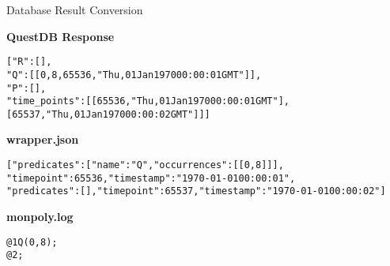 \begin{frame}{Database Result Conversion}

\textbf{QuestDB Response}
    \begin{alltt}
[{"R":[]},\\
{"Q":[[0,8,65536,"Thu, 01 Jan 1970 00:00:01 GMT"]]},\\
{"P":[]},\\
{"time\_points":[[65536,"Thu, 01 Jan 1970 00:00:01 GMT"],
                 [65537,"Thu, 01 Jan 1970 00:00:02 GMT"]]}]
    \end{alltt}
\textbf{wrapper.json}
    \begin{alltt}
    [{"predicates":[{"name":"Q","occurrences":[[0,8]]}], \\
        "timepoint":65536,"timestamp":"1970-01-01 00:00:01"}, \\
    {"predicates":[],"timepoint":65537,"timestamp":"1970-01-01 00:00:02"}]
    \end{alltt}

\textbf{monpoly.log}
    \begin{alltt}
@1 Q(0, 8) ; \\
@2 ;
    \end{alltt}


    
\end{frame}